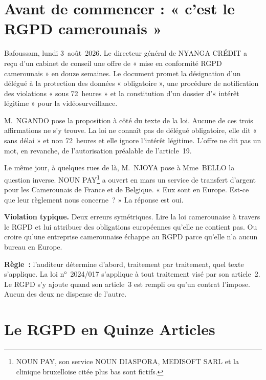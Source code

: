 \section*{Avant de commencer : « c'est le RGPD camerounais »}

Bafoussam, lundi 3~août~2026. Le directeur général de NYANGA CRÉDIT a reçu
d'un cabinet de conseil une offre de « mise en conformité RGPD camerounais »
en douze semaines. Le document promet la désignation d'un délégué à la
protection des données « obligatoire », une procédure de notification des
violations « sous 72~heures » et la constitution d'un dossier d'« intérêt
légitime » pour la vidéosurveillance.

M.~NGANDO pose la proposition à côté du texte de la loi. Aucune de ces trois
affirmations ne s'y trouve. La loi ne connaît pas de délégué obligatoire,
elle dit « sans délai » et non 72~heures et elle ignore l'intérêt légitime.
L'offre ne dit pas un mot, en revanche, de l'autorisation préalable de
l'article~19.

Le même jour, à quelques rues de là, M.~NJOYA pose à Mme~BELLO la question
inverse. NOUN PAY\footnote{NOUN PAY, son service NOUN DIASPORA, MEDISOFT
SARL et la clinique bruxelloise citée plus bas sont fictifs.} a ouvert en
mars un service de transfert d'argent pour les Camerounais de France et de
Belgique. « Eux sont en Europe. Est-ce que leur règlement nous concerne~? »
La réponse est oui.

\begin{boxalert}
\textbf{Violation typique.} Deux erreurs symétriques. Lire la loi
camerounaise à travers le RGPD et lui attribuer des obligations européennes
qu'elle ne contient pas. Ou croire qu'une entreprise camerounaise échappe au
RGPD parce qu'elle n'a aucun bureau en Europe.

\textbf{Règle~:} l'auditeur détermine d'abord, traitement par traitement,
quel texte s'applique. La loi n°~2024/017 s'applique à tout traitement visé
par son article~2. Le RGPD s'y ajoute quand son article~3 est rempli ou
qu'un contrat l'impose. Aucun des deux ne dispense de l'autre.
\end{boxalert}

\section{Le RGPD en Quinze Articles}
\label{sec:c04-economie}

